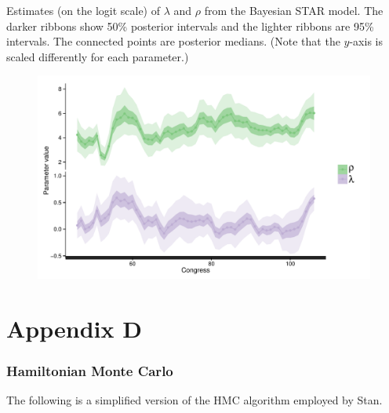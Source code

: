 Estimates (on the logit scale) of $\lambda$ and $\rho$ from the Bayesian STAR model. 
The darker ribbons show 50\% posterior intervals and the lighter ribbons are 95\% 
intervals. The connected points are posterior medians. 
(Note that the $y$-axis is scaled differently for each parameter.) 

\vspace{.5cm}

\begin{figure}[h]
\centering
	\includegraphics[scale=0.8]{sections/figs/lambda_rho}
\label{fig:lambda_rho}
\end{figure}





\chapter*{Appendix D}\label{AppendixD}
\vspace{-1.75cm}
\subsection*{Hamiltonian Monte Carlo}

The following is a simplified version of the HMC algorithm employed by Stan. 

